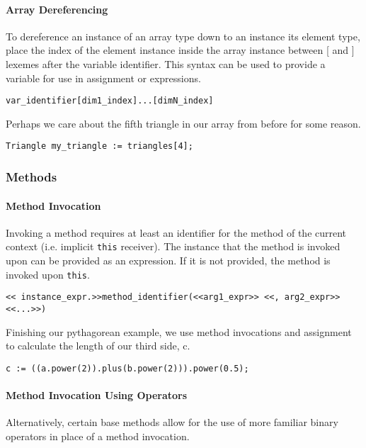\paragraph{Array Dereferencing}
To dereference an instance of an array type down to an instance its element type, place the index of the element instance inside the array instance between [ and ] lexemes after the variable identifier. This syntax can be used to provide a variable for use in assignment or expressions.

\begin{lstlisting}
var_identifier[dim1_index]...[dimN_index]
\end{lstlisting}

Perhaps we care about the fifth triangle in our array from before for some reason.

\begin{lstlisting}[caption=Array Dereferencing a Triangle, backgroundcolor=\color{tintedorange}]
Triangle my_triangle := triangles[4];
\end{lstlisting}


\subsubsection{Methods}
\paragraph{Method Invocation}
Invoking a method requires at least an identifier for the method of the current context (i.e. implicit \verb!this! receiver). The instance that the method is invoked upon can be provided as an expression. If it is not provided, the method is invoked upon \verb!this!.

\begin{lstlisting}
<< instance_expr.>>method_identifier(<<arg1_expr>> <<, arg2_expr>> <<...>>)
\end{lstlisting}

Finishing our pythagorean example, we use method invocations and assignment to calculate the length of our third side, c.

\begin{lstlisting}[backgroundcolor=\color{tintedorange},caption=Method Invocation for the Pythagorean Theorem Using Methods]
c := ((a.power(2)).plus(b.power(2))).power(0.5);
\end{lstlisting}

\paragraph{Method Invocation Using Operators}
Alternatively, certain base methods allow for the use of more familiar binary operators in place of a method invocation.

